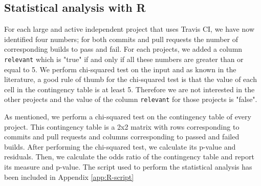 \subsection{Statistical analysis with R}
For each large and active independent project that uses Travis CI, we have now identified four numbers; for both commits and pull requests the number of corresponding builds to pass and fail.
For each projects, we added a column \texttt{relevant} which is "true" if and only if all these numbers are greater than or equal to 5.
We perform chi-squared test on the input and as known in the literature, a good rule of thumb for the chi-squared test is that the value of each cell in the contingency table is at least 5.
Therefore we are not interested in the other projects and the value of the column \texttt{relevant} for those projects is "false".

As mentioned, we perform a chi-squared test on the contingency table of every project.
This contingency table is a 2x2 matrix with rows corresponding to commits and pull requests and columns corresponding to passed and failed builds.
After performing the chi-squared test, we calculate its p-value and residuals. %
Then, we calculate the odds ratio of the contingency table and report its measure and p-value. %
The script used to perform the statistical analysis has been included in Appendix \ref{app:R-script}




